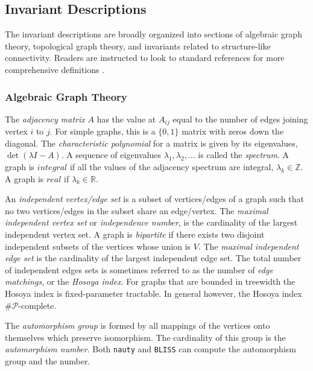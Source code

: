 \documentclass[12pt]{article}
\begin{document}
\begin{appendices}

\section{Invariant Descriptions}
\label{app:invariants}

The invariant descriptions are broadly organized into sections of algebraic graph theory, topological graph theory, and invariants related to structure-like connectivity.
Readers are instructed to look to standard references for more comprehensive definitions \cite{diestel2010graph, bondy2008graph, bollobas1998modern}.

\subsubsection*{Algebraic Graph Theory}

The \textit{adjacency matrix} $A$ has the value at $A_{ij}$ equal to the number of edges joining vertex $i$ to $j$. 
For simple graphs, this is a $\{0,1\}$ matrix with zeros down the diagonal. 
The \textit{characteristic polynomial} for a matrix is given by its eigenvalues, $\det(\lambda I - A)$.
A sequence of eigenvalues $\lambda_1, \lambda_2, \ldots$ is called the \textit{spectrum}.
A graph is $integral$ if all the values of the adjacency spectrum are integral, $\lambda_k \in \mathbb{Z}$. 
A graph is $real$ if $\lambda_k \in \mathbb{R}$.

An \textit{independent vertex/edge set} is a subset of vertices/edges of a graph such that no two vertices/edges in the subset share an edge/vertex. 
The \textit{maximal independent vertex set} or \textit{independence number}, is the cardinality of the largest independent vertex set.
A graph is \textit{bipartite} if there exists two disjoint independent subsets of the vertices whose union is $V$.
The \textit{maximal independent edge set} is the cardinality of the largest independent edge set.
The total number of independent edges sets is sometimes referred to as the number of \textit{edge matchings}, or the \textit{Hosoya index}\cite{hosoya1971topological}.
For graphs that are bounded in treewidth the Hosoya index is fixed-parameter tractable.
In general however, the Hosoya index $\mathcal{\#P}$-complete\cite{jerrum1987two}.

The \textit{automorphism group} is formed by all mappings of the vertices onto themselves which preserve isomorphism. 
The cardinality of this group is the \textit{automorphism number}.
Both \texttt{nauty} and \texttt{BLISS} \cite{junttila2007engineering,mckay2014practical} can compute the automorphism group and the number.


\end{appendices}
\end{document}
